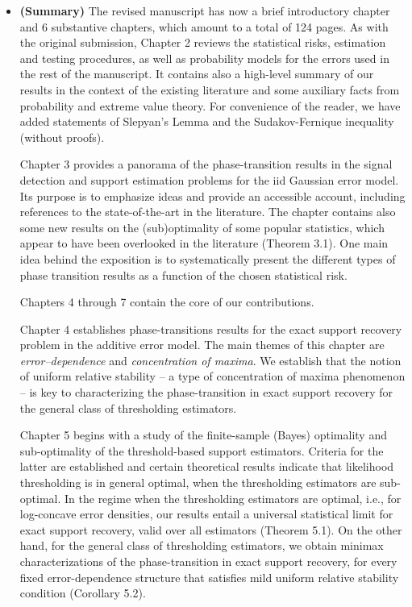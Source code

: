 \documentclass[11pt]{article}
\begin{document}
 \begin{itemize}
  \item {\bf (Summary)} The revised manuscript has now a brief introductory chapter and 6 substantive chapters, 
  which amount to a total of 124 pages. As with the original submission,  Chapter 2 reviews the statistical risks, estimation and testing procedures,
  as well as probability models for the errors used in the rest of the manuscript.  It contains also a high-level summary of our results 
  in the context of the existing literature and some auxiliary facts from probability and extreme value theory.  For convenience of the reader, we 
  have added statements of Slepyan's Lemma and the Sudakov-Fernique inequality (without proofs).
  
   Chapter 3 provides a panorama of the phase-transition results in the signal detection and support estimation problems for the
   iid Gaussian error model.  Its purpose is to emphasize ideas and provide an accessible account, including references to the state-of-the-art 
   in the literature.  The chapter contains also some new results on the (sub)optimality of some popular statistics, which appear to have been 
   overlooked in the literature (Theorem 3.1).  One main idea  behind the exposition is to systematically present the different types of phase transition 
   results as a function of the chosen statistical risk.  
   
   Chapters 4 through 7 contain the core of our contributions.  
   
   Chapter 4 establishes phase-transitions results for the exact support recovery problem in the additive error model.  The main themes of this 
   chapter are {\em error--dependence} and {\em concentration of maxima}. We establish that the notion of uniform relative stability -- 
   a type of concentration of maxima phenomenon -- is key to characterizing the phase-transition in exact support recovery for the general class 
   of thresholding estimators. 
   
   Chapter 5 begins with a study of the finite-sample (Bayes) optimality and sub-optimality of the threshold-based support estimators.  
   Criteria for the latter are established and certain theoretical results indicate that likelihood thresholding is in general optimal, when the thresholding 
   estimators are sub-optimal.  In the regime when the thresholding estimators are optimal, i.e., for log-concave error densities, our results entail 
   a universal statistical limit for exact support recovery, valid over all estimators (Theorem 5.1).   On the other hand, for the general class of
   thresholding estimators, we obtain minimax characterizations of the phase-transition in exact support recovery, for every fixed error-dependence 
   structure that satisfies mild uniform relative stability condition (Corollary 5.2).
    

\end{itemize}
\end{document}
